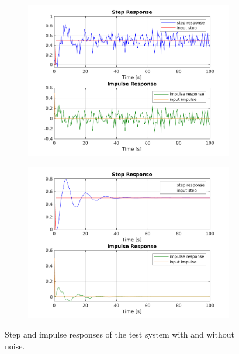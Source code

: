 \documentclass{scrartcl}
\begin{document}
\begin{figure}[h]
	\centering
	\begin{subfigure}{0.49\textwidth}
		\includegraphics[width=\textwidth]{figures/noisy_responses.pdf}
	\end{subfigure}
	\begin{subfigure}{0.49\textwidth}
		\includegraphics[width=\textwidth]{figures/noisefree.pdf}
	\end{subfigure}
	\caption{Step and impulse responses of the test system with and without noise.}\label{fig:responses}
\end{figure}

\newpage
\end{document}
